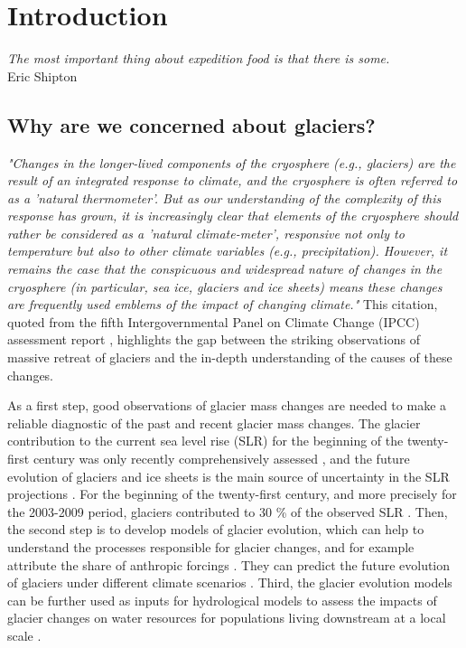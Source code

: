 \chapter{Introduction}
\label{chap:intro}

\begin{flushright}
\textit{The most important thing about expedition food is that there is some.}\\
Eric Shipton
\end{flushright}

\section*{Why are we concerned about glaciers?}
\emph{"Changes in the longer-lived components of the cryosphere (e.g., glaciers) are the result of an integrated response to climate, and the cryosphere is often referred to as a 'natural thermometer'. But as our understanding of the complexity of this response has grown, it is increasingly clear that elements of the cryosphere should rather be considered as a 'natural climate-meter', responsive not only to temperature but also to other climate variables (e.g., precipitation). However, it remains the case that the conspicuous and widespread nature of changes in the cryosphere (in particular, sea ice, glaciers and ice sheets) means these changes are frequently used emblems of the impact of changing climate."} This citation, quoted from the fifth Intergovernmental Panel on Climate Change (IPCC) assessment report \citep{vaughan_2013}, highlights the gap between the striking observations of massive retreat of glaciers and the in-depth understanding of the causes of these changes. 


As a first step, good observations of glacier mass changes are needed to make a reliable diagnostic of the past and recent glacier mass changes. The glacier  contribution to the current sea level rise (SLR) for the beginning of the twenty-first century was only recently comprehensively assessed \citep{gardner_reconciled_2013}, and the future evolution of glaciers and ice sheets is the main source of uncertainty in the SLR projections \citep{church_sea_2013}. For the beginning of the twenty-first century, and more precisely for the 2003-2009 period, glaciers contributed to 30 \% of the observed SLR \citep{gardner_reconciled_2013}. Then, the second step is to develop models of glacier evolution, which can help to understand the processes responsible for glacier changes, and for example attribute the share of anthropic forcings \citep{marzeion_attribution_2014}. They can predict the future evolution of glaciers under different climate scenarios \citep{marzeion_past_2012,radic_regional_2014,huss_new_2015,marzeion_limited_2018}. Third, the glacier evolution models can be further used as inputs for hydrological models to assess the impacts of glacier changes on water resources for populations living downstream at a local scale \citep{huss_toward_2017,huss_global-scale_2018,milner_glacier_2017}.


